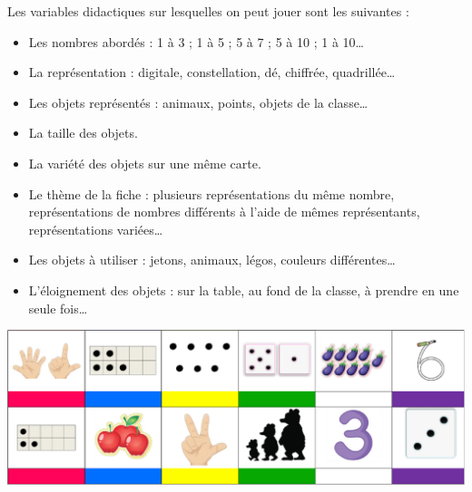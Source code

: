 \begin{exercice*}
   Les variables didactiques sur lesquelles on peut jouer sont les suivantes : 
   \begin{itemize}
      \item Les nombres abordés : 1 à 3 ; 1 à 5 ; 5 à 7 ; 5 à 10 ; 1 à 10\dots
      \item La représentation : digitale, constellation, dé, chiffrée, quadrillée\dots
      \item Les objets représentés : animaux, points, objets de la classe\dots
      \item La taille des objets.
      \item La variété des objets sur une même carte.
      \item Le thème de la fiche : plusieurs représentations du même nombre, représentations de nombres différents à l'aide de mêmes représentants, représentations variées\dots
      \item Les objets à utiliser : jetons, animaux, légos, couleurs différentes\dots
      \item L'éloignement des objets : sur la table, au fond de la classe, à prendre en une seule fois\dots \\
   \end{itemize}
   \begin{center}
     \includegraphics[width=16cm]{Nombres_et_calculs_did/Images/Num1_activites_fiches_boite_oeufs}
   \end{center}
\end{exercice*}

\bigskip


